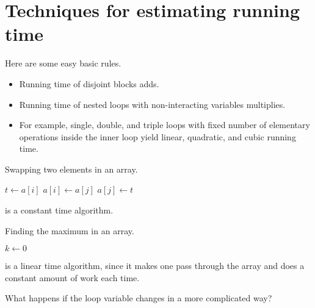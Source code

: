 \chapter{Techniques for estimating running time} %
Here are some easy basic rules.
\begin{itemize}
\item Running time of disjoint blocks adds.
\item Running time of nested loops with non-interacting variables multiplies.
\item For example, single, double, and triple loops with fixed number of elementary operations inside the inner loop yield linear, quadratic, and cubic running time.
\end{itemize}

\begin{algorithm}[H]
  \caption{Swapping two elements in an array.}
  \label{alg:swap}
\begin{algorithmic}[0]
	\State $t \gets a[i]$
	\State $a[i] \gets a[j]$
	\State $a[j] \gets t$
	\State {}
\EndFunction
\end{algorithmic}
\end{algorithm}
%
 is a constant time algorithm.

\begin{algorithm}[H]
  \caption{Finding the maximum in an array.
    \label{alg:findmax}}
\begin{algorithmic}[0]
	\State $k \gets 0$ 
		\EndIf
	\EndFor
	\State {}
\EndFunction
\end{algorithmic}
\end{algorithm}
%
 is a linear time algorithm, since it makes one pass through the array and does a constant amount of work each time.

\pagebreak[4]
What happens if the loop variable changes in a more complicated way?

